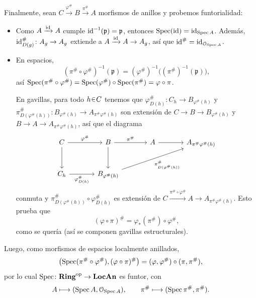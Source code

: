 \begin{sol}
Finalmente, sean $C\xrightarrow{\varphi^\#}B\xrightarrow{\pi^\#}A$ morfismos de anillos y probemos funtorialidad:
\begin{itemize}
\item Como $A\xrightarrow{\operatorname{id}}A$ cumple $\operatorname{id}^{-1}(\mathfrak p)=\mathfrak p$, entonces $\operatorname{Spec}(\operatorname{id})=\operatorname{id}_{\operatorname{Spec} A}$. Además, $\operatorname{id}^\#_{D(g)}\colon A_g\to A_g$ extiende a $A\xrightarrow{\operatorname{id}}A\to A_g$, así que $\operatorname{id}^\#=\operatorname{id}_{\mathcal O_{\operatorname{Spec} A}}$.

\item En espacios,
\[
(\pi^\#\circ\varphi^\#)^{-1}(\mathfrak p)
=(\varphi^\#)^{-1}\bigl((\pi^\#)^{-1}(\mathfrak p)\bigr),
\]
así $\operatorname{Spec}(\pi^\#\circ\varphi^\#)=\operatorname{Spec}(\varphi^\#)\circ\operatorname{Spec}(\pi^\#)=\varphi\circ\pi$.

En gavillas, para todo $h\en C$ tenemos que $\varphi^\#_{D(h)}\colon C_h\to B_{\varphi^\#(h)}$ y $\pi^\#_{D(\varphi^\#(h))}\colon B_{\varphi^\#(h)}\to A_{\pi^\#\varphi^\#(h)}$ son extensión de $C\to B\to B_{\varphi^\#(h)}$ y $B\to A\to A_{\pi^\#\varphi^\#(h)}$, así que el diagrama
\[
\begin{tikzcd}[column sep=large,row sep=large]
C\arrow[r,"\varphi^\#"]\arrow[d]&B\arrow[r,"\pi^\#"]\arrow[d]&A\arrow[r]&A_{\pi^\#\varphi^\#(h)}\\
C_h\arrow[r,"\varphi^\#_{D(h)}"']&B_{\varphi^\#(h)}\arrow[urr,"\pi^\#_{D(\varphi^\#(h))}"']
\end{tikzcd}
\]
conmuta y $\pi^\#_{D(\varphi^\#(h))}\circ\varphi^\#_{D(h)}$ es extensión de $C\xrightarrow{\pi^\#\circ\varphi^\#}A\to A_{\pi^\#\varphi^\#(h)}$. Esto prueba que
\[
(\varphi\circ\pi)^\#=\varphi_*(\pi^\#)\circ\varphi^\#,
\]
como se quería (así se componen gavillas estructurales).
\end{itemize}
Luego, como morfismos de espacios localmente anillados,
\[
\bigl(\operatorname{Spec}(\pi^\#\circ\varphi^\#),(\varphi\circ\pi)^\#\bigr)
=(\varphi,\varphi^\#)\circ(\pi,\pi^\#),
\]
por lo cual $\operatorname{Spec}\colon\mathbf{Ring}^{\mathrm{op}}\to\mathbf{LocAn}$ es funtor, con
\[
A\longmapsto(\operatorname{Spec} A,\mathcal O_{\operatorname{Spec} A}),
\qquad\pi^\#\longmapsto(\operatorname{Spec}\pi^\#,\pi^\#).
\]
\end{sol}
